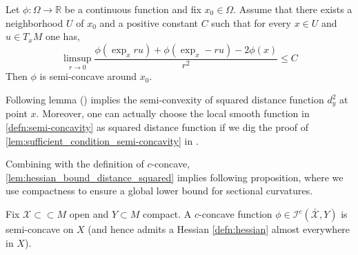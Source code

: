 \begin{lem}
	\label{lem:sufficient_condition_semi-concavity}
	Let \( \phi : \Omega \rightarrow \mathbb { R } \) be a continuous function and fix \( x _ { 0 } \in \Omega \).
	Assume that there exists a neighborhood \( U \) of \( x _ { 0 } \) and a positive constant \( C \) such that for every \( x \in U \) and
	\( u \in T _ { x } M \) one has,
	\[ \limsup _ { r \rightarrow 0 } \frac { \phi \left( \exp _ { x } r u \right) + \phi \left( \exp _ { x } - r u \right) - 2 \phi ( x ) } { r ^ { 2 } } \leq C \]
	Then \( \phi \) is semi-concave around \( x _ { 0 } \).
\end{lem}
Following lemma (\cite[Lemma 3.12]{cordero2001riemannian}) implies
the semi-convexity of squared distance function $d_y^2$ at point $x$.
Moreover, one can actually choose the local smooth function in \cref{defn:semi-concavity} as squared distance function
if we dig the proof of \cref{lem:sufficient_condition_semi-concavity} in \cite[Lemma 3.11]{cordero2001riemannian}.


Combining with the definition of $c$-concave,
\cref{lem:hessian_bound_distance_squared} implies following proposition,
where we use compactness to ensure a global lower bound for sectional curvatures.

\begin{prop}
	Fix \(\mathcal{X} \subset \subset M \) open and \( Y \subset M \) compact.
	A \( c \)-concave function \( \phi \in \mathcal{I} ^ { c } ( \bar { \mathcal{X} } , Y ) \) is semi-concave on \( X \) (and hence admits a Hessian \cref{defn:hessian} almost everywhere in \( X \)).
\end{prop}

